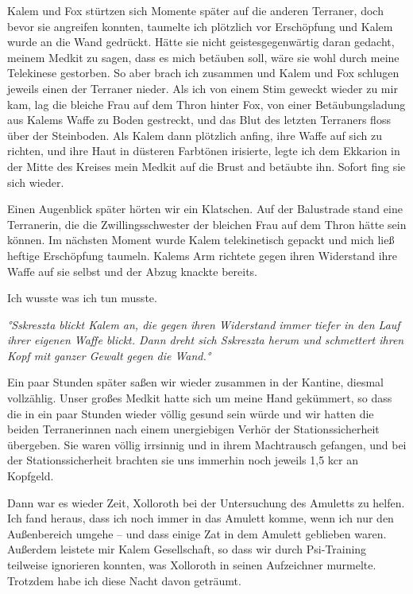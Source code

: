 \documentclass[11pt]{scrartcl}
\begin{document}
Kalem und Fox stürtzen sich Momente später auf die anderen Terraner,
doch bevor sie angreifen konnten, taumelte ich plötzlich vor Erschöpfung
und Kalem wurde an die Wand gedrückt. Hätte sie nicht geistesgegenwärtig
daran gedacht, meinem Medkit zu sagen, dass es mich betäuben soll, wäre
sie wohl durch meine Telekinese gestorben. So aber brach ich zusammen
und Kalem und Fox schlugen jeweils einen der Terraner nieder. Als ich
von einem Stim geweckt wieder zu mir kam, lag die bleiche Frau auf dem
Thron hinter Fox, von einer Betäubungsladung aus Kalems Waffe zu Boden
gestreckt, und das Blut des letzten Terraners floss über der Steinboden.
Als Kalem dann plötzlich anfing, ihre Waffe auf sich zu richten, und
ihre Haut in düsteren Farbtönen irisierte, legte ich dem Ekkarion in der
Mitte des Kreises mein Medkit auf die Brust and betäubte ihn. Sofort
fing sie sich wieder.

Einen Augenblick später hörten wir ein Klatschen. Auf der Balustrade
stand eine Terranerin, die die Zwillingsschwester der bleichen Frau auf
dem Thron hätte sein können. Im nächsten Moment wurde Kalem
telekinetisch gepackt und mich ließ heftige Erschöpfung taumeln. Kalems
Arm richtete gegen ihren Widerstand ihre Waffe auf sie selbst und der
Abzug knackte bereits.

Ich wusste was ich tun musste.

\emph{°Sskreszta blickt Kalem an, die gegen ihren Widerstand immer
tiefer in den Lauf ihrer eigenen Waffe blickt. Dann dreht sich Sskreszta
herum und schmettert ihren Kopf mit ganzer Gewalt gegen die Wand.°}

Ein paar Stunden später saßen wir wieder zusammen in der Kantine,
diesmal vollzählig. Unser großes Medkit hatte sich um meine Hand
gekümmert, so dass die in ein paar Stunden wieder völlig gesund sein
würde und wir hatten die beiden Terranerinnen nach einem unergiebigen
Verhör der Stationssicherheit übergeben. Sie waren völlig irrsinnig und
in ihrem Machtrausch gefangen, und bei der Stationssicherheit brachten
sie uns immerhin noch jeweils 1,5 kcr an Kopfgeld.

Dann war es wieder Zeit, Xolloroth bei der Untersuchung des Amuletts zu
helfen. Ich fand heraus, dass ich noch immer in das Amulett komme, wenn
ich nur den Außenbereich umgehe -- und dass einige Zat in dem Amulett
geblieben waren. Außerdem leistete mir Kalem Gesellschaft, so dass wir
durch Psi-Training teilweise ignorieren konnten, was Xolloroth in seinen
Aufzeichner murmelte. Trotzdem habe ich diese Nacht davon geträumt.
\end{document}
